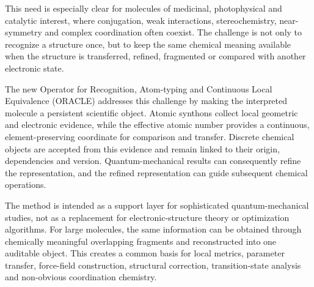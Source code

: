 \documentclass[journal=jctcce,manuscript=article]{achemso}
\begin{document}
This need is especially clear for molecules of medicinal, photophysical and
catalytic interest, where conjugation, weak interactions, stereochemistry,
near-symmetry and complex coordination often coexist.  The challenge is not
only to recognize a structure once, but to keep the same chemical meaning
available when the structure is transferred, refined, fragmented or compared
with another electronic state.

The new Operator for Recognition, Atom-typing and Continuous Local Equivalence
(ORACLE) addresses this challenge by making the interpreted molecule a
persistent scientific object.  Atomic synthons collect local geometric and
electronic evidence, while the effective atomic number provides a continuous,
element-preserving coordinate for comparison and transfer.  Discrete chemical
objects are accepted from this evidence and remain linked to their origin,
dependencies and version.  Quantum-mechanical results can consequently refine
the representation, and the refined representation can guide subsequent
chemical operations.

The method is intended as a support layer for sophisticated quantum-mechanical
studies, not as a replacement for electronic-structure theory or optimization
algorithms.  For large molecules, the same information can be obtained through
chemically meaningful overlapping fragments and reconstructed into one
auditable object.  This creates a common basis for local metrics, parameter
transfer, force-field construction, structural correction, transition-state
analysis and non-obvious coordination chemistry.
\end{document}
